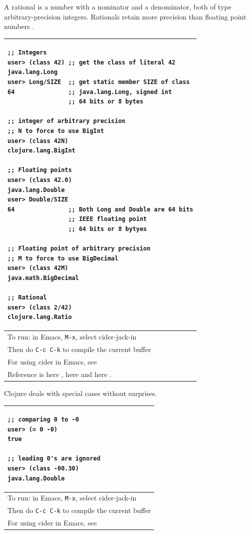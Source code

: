 \documentclass[12pt]{article}
\begin{document}
A rational is a number with a nominator and a denominator, both of type arbitrary-precision integers. Rationals retain more precision than floating point numbers \cite{fogus2011joy}.

\begin{tabular}{|p{}|}
\hline
\begin{verbatim}
;; Integers
user> (class 42) ;; get the class of literal 42
java.lang.Long
user> Long/SIZE  ;; get static member SIZE of class 
64               ;; java.lang.Long, signed int
                 ;; 64 bits or 8 bytes

;; integer of arbitrary precision
;; N to force to use BigInt
user> (class 42N)
clojure.lang.BigInt

;; Floating points
user> (class 42.0)
java.lang.Double
user> Double/SIZE
64               ;; Both Long and Double are 64 bits
                 ;; IEEE floating point
                 ;; 64 bits or 8 bytyes
                 
;; Floating point of arbitrary precision
;; M to force to use BigDecimal
user> (class 42M) 
java.math.BigDecimal

;; Rational
user> (class 2/42)
clojure.lang.Ratio
\end{verbatim}
\\
\hline
To run: in Emacs, \texttt{M-x}, select cider-jack-in\\
Then do \texttt{C-c C-k} to compile the current buffer\\
For using cider in Emacs, see \cite{brave2015}\\
\hline
Reference is here \cite{fogus2014joy}, here \cite{emerick2012clojure} and here \cite{interop}. \\
\hline
\end{tabular}

Clojure deals with special cases without surprises. 


\begin{tabular}{|p{}|}
\hline
\begin{verbatim}
;; comparing 0 to -0
user> (= 0 -0)
true

;; leading 0's are ignored
user> (class -00.30)
java.lang.Double
\end{verbatim}
\\
\hline
To run: in Emacs, \texttt{M-x}, select cider-jack-in\\
Then do \texttt{C-c C-k} to compile the current buffer\\
For using cider in Emacs, see \cite{brave2015}\\
\hline
\end{tabular}
\end{document}

